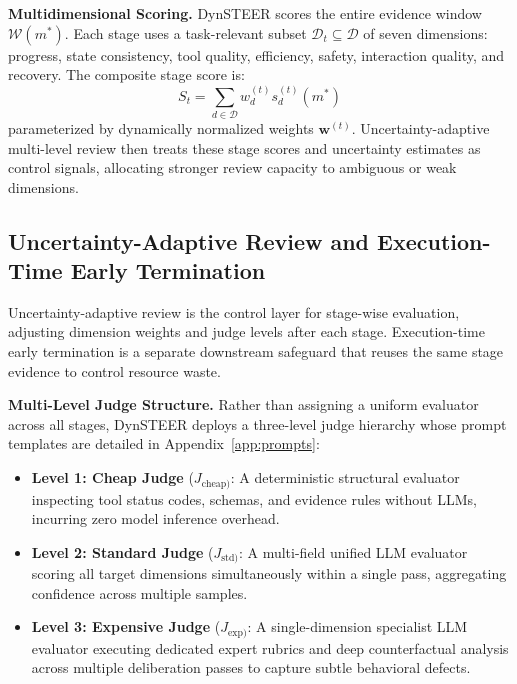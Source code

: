 \textbf{Multidimensional Scoring.} DynSTEER scores the entire evidence window $\mathcal{W}(m^*)$. Each stage uses a task-relevant subset $\mathcal{D}_t \subseteq \mathcal{D}$ of seven dimensions: progress, state consistency, tool quality, efficiency, safety, interaction quality, and recovery. The composite stage score is:
\begin{equation}
    S_t = \sum_{d \in \mathcal{D}} w_d^{(t)} s_d^{(t)}(m^*)
    \label{eq:stage_scoring}
\end{equation}
parameterized by dynamically normalized weights $\mathbf{w}^{(t)}$.
Uncertainty-adaptive multi-level review then treats these stage scores and uncertainty estimates as control signals, allocating stronger review capacity to ambiguous or weak dimensions. 

\subsection{Uncertainty-Adaptive Review and Execution-Time Early Termination}
\label{sec:routing_early_stop}
Uncertainty-adaptive review is the control layer for stage-wise evaluation, adjusting dimension weights and judge levels after each stage. 
Execution-time early termination is a separate downstream safeguard that reuses the same stage evidence to control resource waste.

\textbf{Multi-Level Judge Structure.} Rather than assigning a uniform evaluator across all stages, DynSTEER deploys a three-level judge hierarchy whose prompt templates are detailed in Appendix~\ref{app:prompts}:
\begin{itemize}[leftmargin=*,itemsep=1.5pt,topsep=1pt]
    \item \textbf{Level 1: Cheap Judge} ($J_{\text{cheap})}$: A deterministic structural evaluator inspecting tool status codes, schemas, and evidence rules without LLMs, incurring zero model inference overhead.
    \item \textbf{Level 2: Standard Judge} ($J_{\text{std})}$: A multi-field unified LLM evaluator scoring all target dimensions simultaneously within a single pass, aggregating confidence across multiple samples.
    \item \textbf{Level 3: Expensive Judge} ($J_{\text{exp})}$: A single-dimension specialist LLM evaluator executing dedicated expert rubrics and deep counterfactual analysis across multiple deliberation passes to capture subtle behavioral defects.
\end{itemize}

